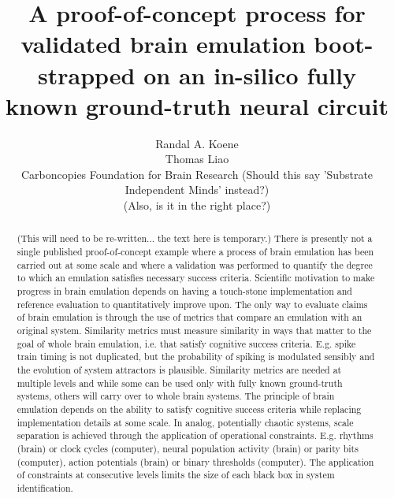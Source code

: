 \documentclass{ldr-article}
\title{A proof-of-concept process for validated brain emulation boot-strapped on an in-silico fully known ground-truth neural circuit}
\author{
Randal A. Koene\\
Thomas Liao\\
Carboncopies Foundation for Brain Research (Should this say 'Substrate Independent Minds' instead?)\\
(Also, is it in the right place?)
}
\begin{document}
    \maketitle

    \begin{abstract}
       (This will need to be re-written... the text here is temporary.)
       There is presently not a single published proof-of-concept example where a process of brain emulation has been carried out at some scale and where a validation was performed to quantify the degree to which an emulation satisfies necessary success criteria. Scientific motivation to make progress in brain emulation depends on having a touch-stone implementation and reference evaluation to quantitatively improve upon. The only way to evaluate claims of brain emulation is through the use of metrics that compare an emulation with an original system. Similarity metrics must measure similarity in ways that matter to the goal of whole brain emulation, i.e. that satisfy cognitive success criteria. E.g. spike train timing is not duplicated, but the probability of spiking is modulated sensibly and the evolution of system attractors is plausible. Similarity metrics are needed at multiple levels and while some can be used only with fully known ground-truth systems, others will carry over to whole brain systems. The principle of brain emulation depends on the ability to satisfy cognitive success criteria while replacing implementation details at some scale. In analog, potentially chaotic systems, scale separation is achieved through the application of operational constraints. E.g. rhythms (brain) or clock cycles (computer), neural population activity (brain) or parity bits (computer), action potentials (brain) or binary thresholds (computer). The application of constraints at consecutive levels limits the size of each black box in system identification.
    \end{abstract}
    
\end{document}
